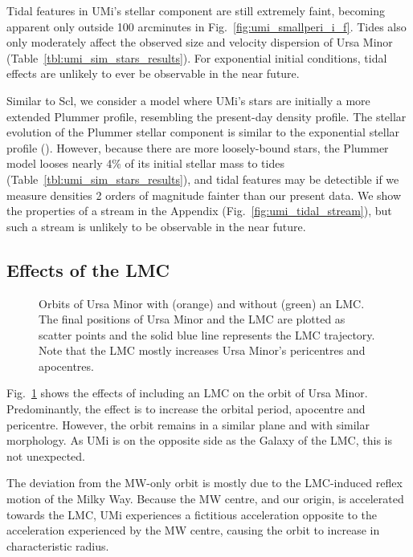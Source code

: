 Tidal features in UMi's stellar component are still extremely faint,
becoming apparent only outside 100 arcminutes in
Fig.~\ref{fig:umi_smallperi_i_f}. Tides also only moderately affect the
observed size and velocity dispersion of Ursa Minor
(Table~\ref{tbl:umi_sim_stars_results}). For exponential initial
conditions, tidal effects are unlikely to ever be observable in the near
future.

Similar to Scl, we consider a model where UMi's stars are initially a
more extended Plummer profile, resembling the present-day density
profile. The stellar evolution of the Plummer stellar component is
similar to the exponential stellar profile (\citet{ig:umi_plummer_i_f}).
However, because there are more loosely-bound stars, the Plummer model
looses nearly 4\% of its initial stellar mass to tides
(Table~\ref{tbl:umi_sim_stars_results}), and tidal features may be
detectible if we measure densities 2 orders of magnitude fainter than
our present data. We show the properties of a stream in the Appendix
(Fig.~\ref{fig:umi_tidal_stream}), but such a stream is unlikely to be
observable in the near future.

\subsection{Effects of the LMC}\label{effects-of-the-lmc}

\begin{figure}
\centering
{}
\caption[Ursa Minor orbits with LMC]{Orbits of Ursa Minor with (orange)
and without (green) an LMC. The final positions of Ursa Minor and the
LMC are plotted as scatter points and the solid blue line represents the
LMC trajectory. Note that the LMC mostly increases Ursa Minor's
pericentres and apocentres.}\label{fig:umi_orbits_lmc}
\end{figure}

Fig.~\ref{fig:umi_orbits_lmc} shows the effects of including an LMC on
the orbit of Ursa Minor. Predominantly, the effect is to increase the
orbital period, apocentre and pericentre. However, the orbit remains in
a similar plane and with similar morphology. As UMi is on the opposite
side as the Galaxy of the LMC, this is not unexpected.

The deviation from the MW-only orbit is mostly due to the LMC-induced
reflex motion of the Milky Way. Because the MW centre, and our origin,
is accelerated towards the LMC, UMi experiences a fictitious
acceleration opposite to the acceleration experienced by the MW centre,
causing the orbit to increase in characteristic radius.

